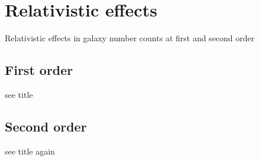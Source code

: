 \chapter{Relativistic effects}
\label{chapter:introreleff}

Relativistic effects in galaxy number counts at first and second order

\section{First order}

see title

\section{Second order}

see title again 